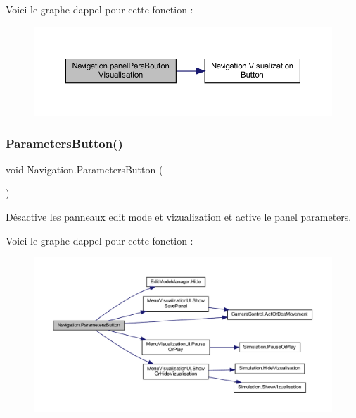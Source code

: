 Voici le graphe d\textquotesingle{}appel pour cette fonction \+:
\nopagebreak
\begin{figure}[H]
\begin{center}
\leavevmode
\includegraphics[width=350pt]{class_navigation_a70f344f826956e694febdfb6fb693af4_cgraph}
\end{center}
\end{figure}
\mbox{\label{class_navigation_adf000d0931e06c79e1e66f266d93e313}} 
\subsubsection{\texorpdfstring{Parameters\+Button()}{ParametersButton()}}
{\footnotesize\ttfamily void Navigation.\+Parameters\+Button (\begin{DoxyParamCaption}{ }\end{DoxyParamCaption})\hspace{0.3cm}{\ttfamily [inline]}}



Désactive les panneaux edit mode et vizualization et active le panel parameters. 

Voici le graphe d\textquotesingle{}appel pour cette fonction \+:
\nopagebreak
\begin{figure}[H]
\begin{center}
\leavevmode
\includegraphics[width=350pt]{class_navigation_adf000d0931e06c79e1e66f266d93e313_cgraph}
\end{center}
\end{figure}
\mbox{\label{class_navigation_ad4dbf103497aef10cc636c40f84dbdde}} 

